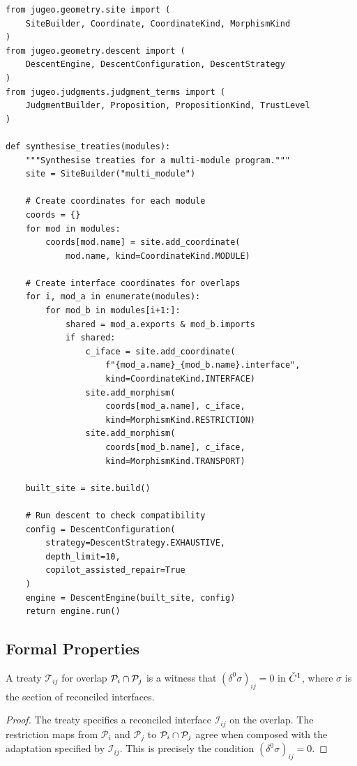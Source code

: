 \documentclass[11pt]{article}
\newcommand{\treaty}{\mathcal{T}}
\newcommand{\patch}{\mathcal{P}}
\newcommand{\iface}{\mathcal{I}}
\begin{document}
\begin{lstlisting}[style=jugeo-python,caption={Treaty synthesis with the JuGeo API.}]
from jugeo.geometry.site import (
    SiteBuilder, Coordinate, CoordinateKind, MorphismKind
)
from jugeo.geometry.descent import (
    DescentEngine, DescentConfiguration, DescentStrategy
)
from jugeo.judgments.judgment_terms import (
    JudgmentBuilder, Proposition, PropositionKind, TrustLevel
)

def synthesise_treaties(modules):
    """Synthesise treaties for a multi-module program."""
    site = SiteBuilder("multi_module")

    # Create coordinates for each module
    coords = {}
    for mod in modules:
        coords[mod.name] = site.add_coordinate(
            mod.name, kind=CoordinateKind.MODULE)

    # Create interface coordinates for overlaps
    for i, mod_a in enumerate(modules):
        for mod_b in modules[i+1:]:
            shared = mod_a.exports & mod_b.imports
            if shared:
                c_iface = site.add_coordinate(
                    f"{mod_a.name}_{mod_b.name}.interface",
                    kind=CoordinateKind.INTERFACE)
                site.add_morphism(
                    coords[mod_a.name], c_iface,
                    kind=MorphismKind.RESTRICTION)
                site.add_morphism(
                    coords[mod_b.name], c_iface,
                    kind=MorphismKind.TRANSPORT)

    built_site = site.build()

    # Run descent to check compatibility
    config = DescentConfiguration(
        strategy=DescentStrategy.EXHAUSTIVE,
        depth_limit=10,
        copilot_assisted_repair=True
    )
    engine = DescentEngine(built_site, config)
    return engine.run()
\end{lstlisting}

\subsection{Formal Properties}

\begin{theorem}\label{thm:treaty-witness}
A treaty $\treaty_{ij}$ for overlap $\overlap{\patch_i}{\patch_j}$
is a witness that $(\delta^0 \sigma)_{ij} = 0$ in $\check{C}^1$,
where $\sigma$ is the section of reconciled interfaces.
\end{theorem}

\begin{proof}
The treaty specifies a reconciled interface $\iface_{ij}$ on the
overlap.  The restriction maps from $\patch_i$ and $\patch_j$ to
$\overlap{\patch_i}{\patch_j}$ agree when composed with the
adaptation specified by $\iface_{ij}$.  This is precisely the
condition $(\delta^0 \sigma)_{ij} = 0$.
\end{proof}
\end{document}
